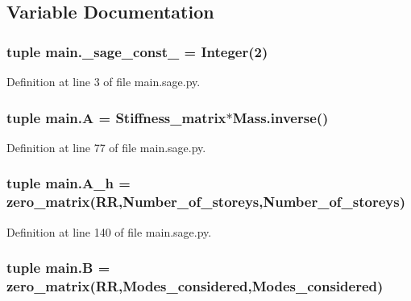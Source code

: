 \subsection{Variable Documentation}
\hypertarget{namespacemain_ad85d7913c0e40b9e1f30e64611a0fafa}{}
\subsubsection[{\+\_\+sage\+\_\+const\+\_\+2}]{\setlength{\rightskip}{0pt plus 5cm}tuple main.\+\_\+sage\+\_\+const\+\_ = Integer(2)}\label{namespacemain_ad85d7913c0e40b9e1f30e64611a0fafa}


Definition at line 3 of file main.\+sage.\+py.

\hypertarget{namespacemain_ad101f166a53497f04b37636bcadbfe65}{}
\subsubsection[{A}]{\setlength{\rightskip}{0pt plus 5cm}tuple main.\+A = {\bf Stiffness\+\_\+matrix}$\ast$Mass.\+inverse()}\label{namespacemain_ad101f166a53497f04b37636bcadbfe65}


Definition at line 77 of file main.\+sage.\+py.

\hypertarget{namespacemain_a49b10c1530f56b101c4cc17b20fb1973}{}
\subsubsection[{A\+\_\+h}]{\setlength{\rightskip}{0pt plus 5cm}tuple main.\+A\+\_\+h = zero\+\_\+matrix(R\+R,Number\+\_\+of\+\_\+storeys,Number\+\_\+of\+\_\+storeys)}\label{namespacemain_a49b10c1530f56b101c4cc17b20fb1973}


Definition at line 140 of file main.\+sage.\+py.

\hypertarget{namespacemain_a6ae8768d11174f5baf9febc5244d6f06}{}
\subsubsection[{B}]{\setlength{\rightskip}{0pt plus 5cm}tuple main.\+B = zero\+\_\+matrix(R\+R,{\bf Modes\+\_\+considered},{\bf Modes\+\_\+considered})}\label{namespacemain_a6ae8768d11174f5baf9febc5244d6f06}


